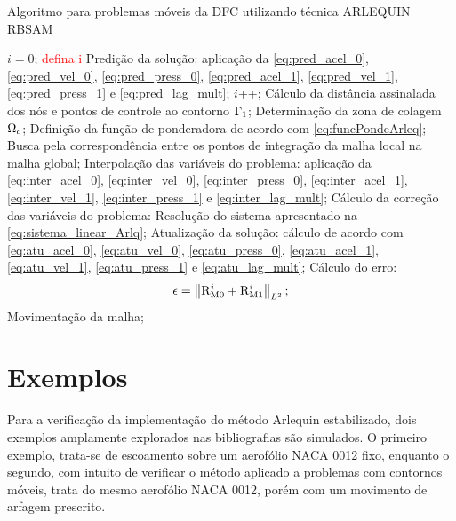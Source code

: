 \begin{algorithm}
	\caption{Algoritmo para problemas móveis da DFC utilizando técnica ARLEQUIN RBSAM}
	\label{alg:fluidARLQ}
	\begin{algorithmic}[1]
		\State $i=0$; \textcolor{red}{defina i}
		\State Predição da solução: aplicação da \autoref{eq:pred_acel_0}, \autoref{eq:pred_vel_0}, \autoref{eq:pred_press_0},
		\autoref{eq:pred_acel_1}, \autoref{eq:pred_vel_1}, \autoref{eq:pred_press_1} e \autoref{eq:pred_lag_mult};
		\State $i$++;
		\State Cálculo da distância assinalada dos nós e pontos de controle ao contorno $\Gamma_1$;
		\State Determinação da zona de colagem $\Omega_c$;
		\State Definição da função de ponderadora de acordo com \autoref{eq:funcPondeArleq};
		\State Busca pela correspondência entre os pontos de integração da malha local na malha global;
		\State Interpolação das variáveis do problema: aplicação da \autoref{eq:inter_acel_0}, \autoref{eq:inter_vel_0}, \autoref{eq:inter_press_0},
		\autoref{eq:inter_acel_1}, \autoref{eq:inter_vel_1}, \autoref{eq:inter_press_1} e \autoref{eq:inter_lag_mult}; 
		\State Cálculo da correção das variáveis do problema: Resolução do sistema apresentado na \autoref{eq:sistema_linear_Arlq};
		\State Atualização da solução: cálculo de acordo com \eqref{eq:atu_acel_0}, \autoref{eq:atu_vel_0}, \autoref{eq:atu_press_0},
		\autoref{eq:atu_acel_1}, \autoref{eq:atu_vel_1}, \autoref{eq:atu_press_1} e \autoref{eq:atu_lag_mult};
		\State Cálculo do erro:
		\begin{align}
			\epsilon =\left\| \mathrm{R}_\mathrm{M0}^{i} + \mathrm{R}_\mathrm{M1}^{i}  \right\|_{L^2};
		\end{align}
		\State Movimentação da malha;
		\EndWhile
		\EndFor
	\end{algorithmic}
\end{algorithm}

\section{Exemplos}\label{capitulo:Cap6:Exemplos}

Para a verificação da implementação do método Arlequin estabilizado, dois exemplos amplamente explorados nas bibliografias são simulados. O primeiro exemplo, trata-se de escoamento sobre um aerofólio NACA 0012 fixo, enquanto o segundo, com intuito de verificar o método aplicado a problemas com contornos móveis, trata do mesmo aerofólio NACA 0012, porém com um movimento de arfagem prescrito. 


